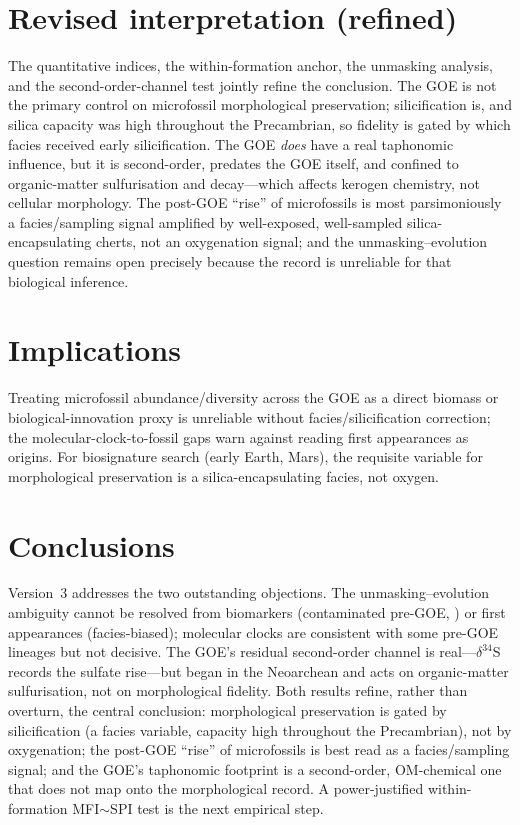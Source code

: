 \documentclass[11pt]{article}
\begin{document}
\section{Revised interpretation (refined)}
The quantitative indices, the within-formation anchor, the unmasking analysis, and the
second-order-channel test jointly refine the conclusion. The GOE is not the primary control on
microfossil morphological preservation; silicification is, and silica capacity was high throughout
the Precambrian, so fidelity is gated by which facies received early silicification. The GOE
\emph{does} have a real taphonomic influence, but it is second-order, predates the GOE itself, and
confined to organic-matter sulfurisation and decay---which affects kerogen chemistry, not cellular
morphology. The post-GOE ``rise'' of microfossils is most parsimoniously a facies/sampling signal
amplified by well-exposed, well-sampled silica-encapsulating cherts, not an oxygenation signal; and
the unmasking--evolution question remains open precisely because the record is unreliable for that
biological inference.

\section{Implications}
Treating microfossil abundance/diversity across the GOE as a direct biomass or biological-innovation
proxy is unreliable without facies/silicification correction; the molecular-clock-to-fossil gaps
warn against reading first appearances as origins. For biosignature search (early Earth, Mars), the
requisite variable for morphological preservation is a silica-encapsulating facies, not oxygen.

\section{Conclusions}
Version~3 addresses the two outstanding objections. The unmasking--evolution ambiguity cannot be
resolved from biomarkers (contaminated pre-GOE, \citealp{French2015}) or first appearances
(facies-biased); molecular clocks are consistent with some pre-GOE lineages but not decisive. The
GOE's residual second-order channel is real---$\delta^{34}$S records the sulfate rise---but began in
the Neoarchean and acts on organic-matter sulfurisation, not on morphological fidelity. Both
results refine, rather than overturn, the central conclusion: morphological preservation is gated by
silicification (a facies variable, capacity high throughout the Precambrian), not by oxygenation;
the post-GOE ``rise'' of microfossils is best read as a facies/sampling signal; and the GOE's
taphonomic footprint is a second-order, OM-chemical one that does not map onto the morphological
record. A power-justified within-formation MFI$\sim$SPI test is the next empirical step.
\end{document}
